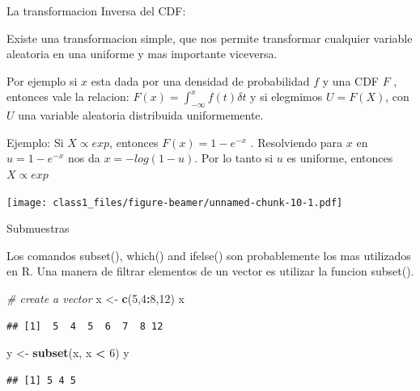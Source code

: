 \documentclass[ignorenonframetext,]{beamer}
\newenvironment{Shaded}{\begin{snugshade}}{\end{snugshade}}
\newcommand{\KeywordTok}[1]{\textcolor[rgb]{0.13,0.29,0.53}{\textbf{#1}}}
\newcommand{\DecValTok}[1]{\textcolor[rgb]{0.00,0.00,0.81}{#1}}
\newcommand{\StringTok}[1]{\textcolor[rgb]{0.31,0.60,0.02}{#1}}
\newcommand{\CommentTok}[1]{\textcolor[rgb]{0.56,0.35,0.01}{\textit{#1}}}
\newcommand{\OperatorTok}[1]{\textcolor[rgb]{0.81,0.36,0.00}{\textbf{#1}}}
\newcommand{\NormalTok}[1]{#1}
\begin{document}
\begin{frame}

\begin{block}{La transformacion Inversa del CDF:}

Existe una transformacion simple, que nos permite transformar cualquier
variable aleatoria en una uniforme y mas importante viceversa.

Por ejemplo si \(x\) esta dada por una densidad de probabilidad \(f\) y
una CDF \(F\) , entonces vale la relacion:
\(F(x)=\int_{-\infty}^{x} f(t) \delta t\) y si elegmimos \(U = F (X)\),
con \(U\) una variable aleatoria distribuida uniformemente.

Ejemplo: Si \(X \propto exp\), entonces \(F (x) = 1-e^{-x}\) .
Resolviendo para \(x\) en \(u = 1-e^{-x}\) nos da \(x = -log(1 - u)\).
Por lo tanto si \(u\) es uniforme, entonces \(X \propto exp\)

\texttt{[image: class1\_files/figure-beamer/unnamed-chunk-10-1.pdf]}

\end{block}

\end{frame}

\begin{frame}[fragile]{Submuestras}

Los comandos subset(), which() and ifelse() son probablemente los mas
utilizados en R. Una manera de filtrar elementos de un vector es
utilizar la funcion subset().

\begin{Shaded}
\begin{Highlighting}[]
\CommentTok{# create a vector}
\NormalTok{x <-}\StringTok{ }\KeywordTok{c}\NormalTok{(}\DecValTok{5}\NormalTok{,}\DecValTok{4}\OperatorTok{:}\DecValTok{8}\NormalTok{,}\DecValTok{12}\NormalTok{)}
\NormalTok{x}
\end{Highlighting}
\end{Shaded}

\begin{verbatim}
## [1]  5  4  5  6  7  8 12
\end{verbatim}

\begin{Shaded}
\begin{Highlighting}[]
\NormalTok{y <-}\StringTok{ }\KeywordTok{subset}\NormalTok{(x, x }\OperatorTok{<}\StringTok{ }\DecValTok{6}\NormalTok{)}
\NormalTok{y}
\end{Highlighting}
\end{Shaded}

\begin{verbatim}
## [1] 5 4 5
\end{verbatim}

\end{frame}
\end{document}
